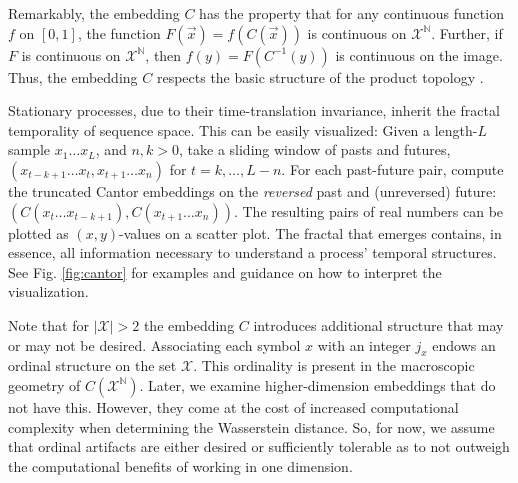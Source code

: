 \documentclass[sigconf, anonymous, review]{acmart}
\begin{document}
Remarkably, the embedding $C$ has the property that for any continuous function
$f$ on $[0,1]$, the function $F(\overrightarrow{x}) = f(C(\overrightarrow{x}))$
is continuous on $\mathcal{X}^\mathbb{N}$. Further, if $F$ is continuous on
$\mathcal{X}^\mathbb{N}$, then $f(y) = F(C^{-1}(y))$ is continuous on the image.
Thus, the embedding $C$ respects the basic structure of the product topology
\cite{Kurk03a}.

Stationary processes, due to their time-translation invariance, inherit the
fractal temporality of sequence space. This can be easily visualized: Given a
length-$L$ sample $x_1\dots x_L$, and $n,k>0$, take a sliding window of pasts
and futures, $(x_{t-k+1}\dots x_t, x_{t+1}\dots x_n)$ for $t=k,\dots,L-n$.  For
each past-future pair, compute the truncated Cantor embeddings on the
\emph{reversed} past and (unreversed) future: $\left(C(x_t \dots
x_{t-k+1}),C(x_{t+1}\dots x_n)\right)$. The resulting pairs of real numbers can
be plotted as $(x,y)$-values on a scatter plot. The fractal that emerges
contains, in essence, all information necessary to understand a process'
temporal structures. See Fig. \ref{fig:cantor} for examples and guidance on how
to interpret the visualization.

Note that for $|\mathcal{X}|>2$ the embedding $C$ introduces additional
structure that may or may not be desired. Associating each symbol $x$ with an
integer $j_x$ endows an ordinal structure on the set $\mathcal{X}$. This
ordinality is present in the macroscopic geometry of
$C\left(\mathcal{X}^{\mathbb{N}}\right)$. Later, we examine higher-dimension
embeddings that do not have this. However, they come at the cost of increased
computational complexity when determining the Wasserstein distance. So, for now,
we assume that ordinal artifacts are either desired or sufficiently tolerable
as to not outweigh the computational benefits of working in one dimension.
\end{document}

